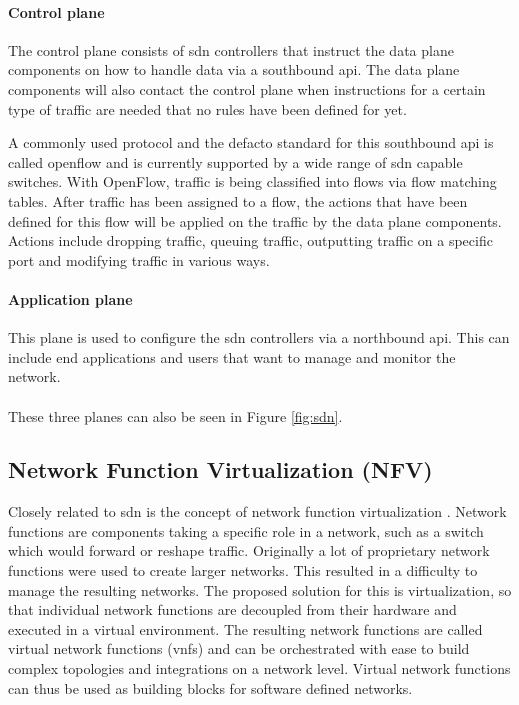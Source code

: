 \paragraph{Control plane} The control plane consists of \acrshort{sdn} controllers that instruct the data plane components on how to handle data via a southbound \acrshort{api}. The data plane components will also contact the control plane when instructions for a certain type of traffic are needed that no rules have been defined for yet.

A commonly used protocol and the defacto standard for this southbound \acrshort{api} is called \Gls{openflow} \cite{openflow} and is currently supported by a wide range of \acrshort{sdn} capable switches. With OpenFlow, traffic is being classified into flows via flow matching tables. After traffic has been assigned to a flow, the actions that have been defined for this flow will be applied on the traffic by the data plane components. Actions include dropping traffic, queuing traffic, outputting traffic on a specific port and modifying traffic in various ways.

\paragraph{Application plane} This plane is used to configure the \acrshort{sdn} controllers via a northbound \acrshort{api}. This can include end applications and users that want to manage and monitor the network.

\paragraph{}These three planes can also be seen in Figure \ref{fig:sdn}.

\subsection{Network Function Virtualization (NFV)}
Closely related to \acrshort{sdn} is the concept of network function virtualization \cite{nfv}. Network functions are components taking a specific role in a network, such as a switch which would forward or reshape traffic. Originally a lot of proprietary network functions were used to create larger networks. This resulted in a difficulty to manage the resulting networks. The proposed solution for this is virtualization, so that individual network functions are decoupled from their hardware and executed in a virtual environment. The resulting network functions are called virtual network functions (\acrshort{vnf}s) and can be orchestrated with ease to build complex topologies and integrations on a network level. Virtual network functions can thus be used as building blocks for software defined networks.

